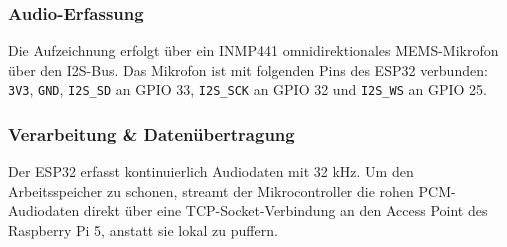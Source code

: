 \documentclass[10pt, a4paper]{scrartcl}
\begin{document}
\subsubsection*{Audio-Erfassung}
Die Aufzeichnung erfolgt über ein INMP441 omnidirektionales MEMS-Mikrofon über den I2S-Bus. Das Mikrofon ist mit folgenden Pins des ESP32 verbunden: \texttt{3V3}, \texttt{GND}, \texttt{I2S\_SD} an GPIO 33, \texttt{I2S\_SCK} an GPIO 32 und \texttt{I2S\_WS} an GPIO 25.

\subsubsection*{Verarbeitung \& Datenübertragung}
Der ESP32 erfasst kontinuierlich Audiodaten mit 32 kHz. Um den Arbeitsspeicher zu schonen, streamt der Mikrocontroller die rohen PCM-Audiodaten direkt über eine TCP-Socket-Verbindung an den Access Point des Raspberry Pi 5, anstatt sie lokal zu puffern.
\end{document}
